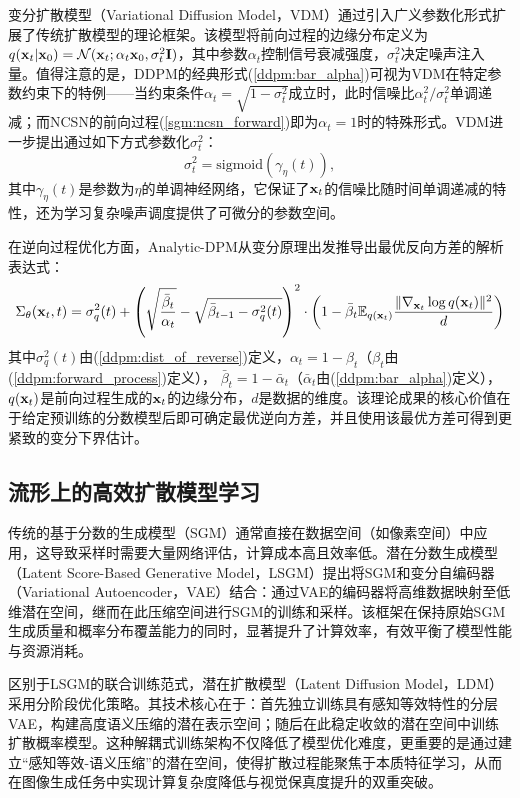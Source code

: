 \documentclass[11pt,a4paper,UTF8]{ctexart}
\begin{document}
变分扩散模型（Variational Diffusion Model，VDM）\cite{kingma2021variational}通过引入广义参数化形式扩展了传统扩散模型的理论框架。该模型将前向过程的边缘分布定义为$q(\mathbf{x}_t|\mathbf{x}_0)=\mathcal{N}(\mathbf{x}_t;\alpha_t\mathbf{x}_0,\sigma_t^2\mathbf{I})$，其中参数$\alpha_t$控制信号衰减强度，$\sigma_t^2$决定噪声注入量。值得注意的是，DDPM的经典形式(\ref{ddpm:bar_alpha})可视为VDM在特定参数约束下的特例——当约束条件$\alpha_t=\sqrt{1-\sigma_t^2}$成立时，此时信噪比$\alpha_t^2/\sigma_t^2$单调递减；而NCSN的前向过程(\ref{sgm:ncsn_forward})即为$\alpha_t=1$时的特殊形式。VDM进一步提出通过如下方式参数化$\sigma_t^2$：
\begin{equation*}
    \sigma_t^2=\text{sigmoid}(\gamma_\eta(t)),
\end{equation*}
其中$\gamma_\eta(t)$是参数为$\eta$的单调神经网络，它保证了$\mathbf{x}_t$的信噪比随时间单调递减的特性，还为学习复杂噪声调度提供了可微分的参数空间。

在逆向过程优化方面，Analytic-DPM\cite{bao2021analytic}从变分原理出发推导出最优反向方差的解析表达式：
\begin{equation*}
    \Sigma_\theta(\mathbf{x}_t,t)=\sigma_q^2(t) + \left(\sqrt{\frac{\bar{\beta}_t}{\alpha_t}} -\sqrt{\bar{\beta}_{t-1}-\sigma_q^2(t)} \right)^2\cdot \left(1-\bar{\beta}_t \mathbb{E}_{q(\mathbf{x}_t)}\frac{\|\nabla_{\mathbf{x}_t}\log q(\mathbf{x}_t) \|^2}{d} \right)
\end{equation*}
其中$\sigma_q^2(t)$由(\ref{ddpm:dist_of_reverse})定义，$\alpha_t=1-\beta_t$（$\beta_t$由(\ref{ddpm:forward_process})定义），
$\bar{\beta}_t=1-\bar{\alpha}_t$（$\bar{\alpha}_t$由(\ref{ddpm:bar_alpha})定义），$q(\mathbf{x}_t)$是前向过程生成的$\mathbf{x}_t$的边缘分布，$d$是数据的维度。该理论成果的核心价值在于给定预训练的分数模型后即可确定最优逆向方差，并且使用该最优方差可得到更紧致的变分下界估计。


\subsection{流形上的高效扩散模型学习}

传统的基于分数的生成模型（SGM）通常直接在数据空间（如像素空间）中应用，这导致采样时需要大量网络评估，计算成本高且效率低。潜在分数生成模型（Latent Score-Based Generative Model，LSGM）\cite{vahdat2021score}提出将SGM和变分自编码器（Variational Autoencoder，VAE）结合：通过VAE的编码器将高维数据映射至低维潜在空间，继而在此压缩空间进行SGM的训练和采样。该框架在保持原始SGM生成质量和概率分布覆盖能力的同时，显著提升了计算效率，有效平衡了模型性能与资源消耗。

区别于LSGM的联合训练范式，潜在扩散模型（Latent Diffusion Model，LDM）\cite{rombach2022high}采用分阶段优化策略。其技术核心在于：首先独立训练具有感知等效特性的分层VAE，构建高度语义压缩的潜在表示空间；随后在此稳定收敛的潜在空间中训练扩散概率模型。这种解耦式训练架构不仅降低了模型优化难度，更重要的是通过建立“感知等效-语义压缩”的潜在空间，使得扩散过程能聚焦于本质特征学习，从而在图像生成任务中实现计算复杂度降低与视觉保真度提升的双重突破。
\end{document}
